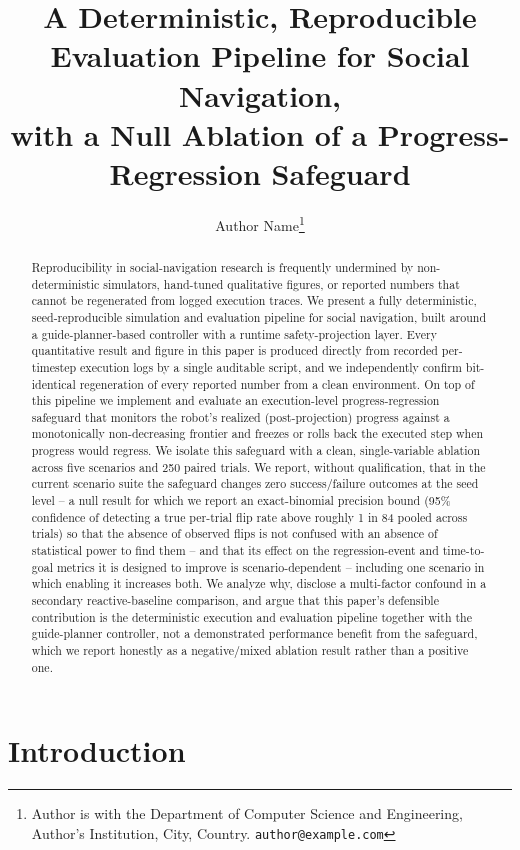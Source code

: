\documentclass[conference,letterpaper,10pt]{ieeeconf}
\title{\LARGE \bf A Deterministic, Reproducible Evaluation Pipeline for Social Navigation, \\ with a Null Ablation of a Progress-Regression Safeguard}
\author{Author Name\thanks{Author is with the Department of Computer Science and Engineering,
Author's Institution, City, Country. {\tt\small author@example.com}}}
\date{}
\begin{document}
\maketitle

\begin{abstract}
Reproducibility in social-navigation research is frequently undermined by
non-deterministic simulators, hand-tuned qualitative figures, or reported
numbers that cannot be regenerated from logged execution traces. We present
a fully deterministic, seed-reproducible simulation and evaluation pipeline
for social navigation, built around a guide-planner-based controller with a
runtime safety-projection layer. Every quantitative result and figure in
this paper is produced directly from recorded per-timestep execution logs
by a single auditable script, and we independently confirm bit-identical
regeneration of every reported number from a clean environment. On top of
this pipeline we implement and evaluate an execution-level
progress-regression safeguard that monitors the robot's realized
(post-projection) progress against a monotonically non-decreasing frontier
and freezes or rolls back the executed step when progress would regress.
We isolate this safeguard with a clean, single-variable ablation across
five scenarios and 250 paired trials. We report, without qualification,
that in the current scenario suite the safeguard changes zero
success/failure outcomes at the seed level -- a null result for which we
report an exact-binomial precision bound (95\% confidence of detecting a
true per-trial flip rate above roughly 1 in 84 pooled across trials) so
that the absence of observed flips is not confused with an absence of
statistical power to find them -- and that its effect on the
regression-event and time-to-goal metrics it is designed to improve is
scenario-dependent -- including one scenario in which enabling it
increases both. We analyze why, disclose a multi-factor confound in a
secondary reactive-baseline comparison, and argue that this paper's
defensible contribution is the deterministic execution and evaluation
pipeline together with the guide-planner controller, not a demonstrated
performance benefit from the safeguard, which we report honestly as a
negative/mixed ablation result rather than a positive one.
\end{abstract}

\section{Introduction}
\end{document}
